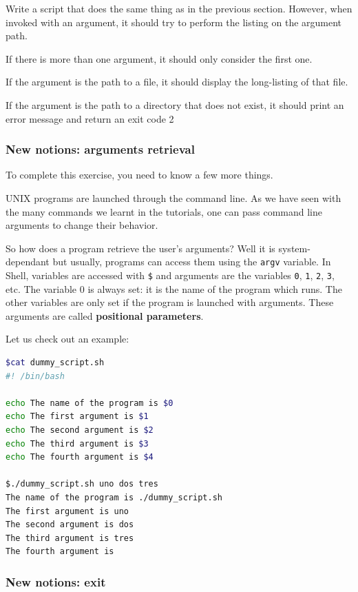 \documentclass[12pt]{article}
\begin{document}
Write a script that does the same thing as in the previous section. However, when invoked with an argument, it should try to perform the listing on the argument path.

If there is more than one argument, it should only consider the first one.

If the argument is the path to a file, it should display the long-listing of that file.

If the argument is the path to a directory that does not exist, it should print an error message and return an exit code 2

\subsubsection{New notions: arguments retrieval}

To complete this exercise, you need to know a few more things.

UNIX programs are launched through the command line. As we have seen with the many commands we learnt in the tutorials, one can pass command line arguments to change their behavior.

So how does a program retrieve the user's arguments? Well it is system-dependant but usually, programs can access them using the \texttt{argv} variable. In Shell, variables are accessed with \texttt{\$} and arguments are the variables \texttt{0}, \texttt{1}, \texttt{2}, \texttt{3}, etc. The variable 0 is always set: it is the name of the program which runs. The other variables are only set if the program is launched with arguments. These arguments are called \textbf{positional parameters}.

Let us check out an example:

\begin{lstlisting}[language=bash]
$cat dummy_script.sh 
#! /bin/bash

echo The name of the program is $0
echo The first argument is $1
echo The second argument is $2
echo The third argument is $3
echo The fourth argument is $4

$./dummy_script.sh uno dos tres
The name of the program is ./dummy_script.sh
The first argument is uno
The second argument is dos
The third argument is tres
The fourth argument is
\end{lstlisting}

\subsubsection{New notions: exit}
\end{document}
